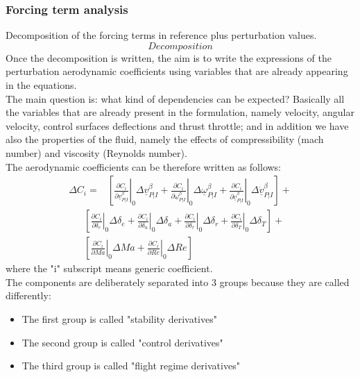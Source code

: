 \subsubsection{Forcing term analysis}
Decomposition of the forcing terms in reference plus perturbation values.
\begin{equation}
    \textit{Decomposition}
\end{equation}
Once the decomposition is written, the aim is to write the expressions of the perturbation aerodynamic coefficients using variables that are already appearing in the equations.
\\
The main question is: what kind of dependencies can be expected?
Basically all the variables that are already present in the formulation, namely velocity, angular velocity, control surfaces deflections and thrust throttle; and in addition we have also the properties of the fluid, namely the effects of compressibility (mach number) and viscosity (Reynolds number).
\\
The aerodynamic coefficients can be therefore written as follows:
\begin{align}
\label{eq: linear form of aerodynamic coefficient}
    \Delta C_i = &\left[\left.\frac{\partial C_i}{\partial \underline{v}_{P|I}^\beta}\right|_0\Delta\underline{v}_{P|I}^\beta+\left.\frac{\partial C_i}{\partial \underline{\omega}_{P|I}^\beta}\right|_0\Delta\underline{\omega}_{P|I}^\beta+\left.\frac{\partial C_i}{\partial \underline{\dot v}_{P|I}^\beta}\right|_0\Delta\underline{\dot v}_{P|I}^\beta\right]+
\end{align}
\begin{align*}
    & \left[\left.\frac{\partial C_i}{\partial \delta_e}\right|_0\Delta\delta_e+\left.\frac{\partial C_i}{\partial \delta_a}\right|_0\Delta\delta_a+\left.\frac{\partial C_i}{\partial \delta_r}\right|_0\Delta\delta_r+\left.\frac{\partial C_i}{\partial \delta_T}\right|_0\Delta\delta_T\right]+\\
    &\left[\left.\frac{\partial C_i}{\partial Ma}\right|_0\Delta Ma+\left.\frac{\partial C_i}{\partial Re}\right|_0\Delta Re\right]
\end{align*}
where the "i" subscript means generic coefficient.
\\
The components are deliberately separated into 3 groups because they are called differently:
\begin{itemize}
    \item The first group is called "stability derivatives"
    \item The second group is called "control derivatives"
    \item The third group is called "flight regime derivatives"
\end{itemize}
